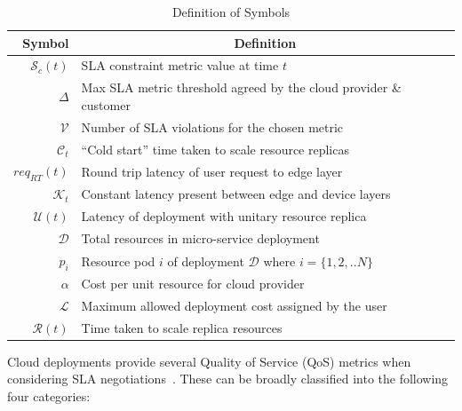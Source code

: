 \begin{table}
    \caption{Definition of Symbols}\label{tab:symbol-definitions}
    \centering
    \begin{tabular}{rl}
        \toprule
        \textbf{Symbol} & \multicolumn{1}{c}{\textbf{Definition}}\\
        \midrule
        $\mathcal{S}_{c}(t)$ & SLA constraint metric value at time $t$\\
        $\Delta$ & Max SLA metric threshold agreed by the cloud provider \& customer\\
        $\mathcal{V}$ & Number of SLA violations for the chosen metric\\
        $\mathcal{C}_{t}$ & ``Cold start'' time taken to scale resource replicas\\
        $req_{RT}(t)$ & Round trip latency of user request to edge layer\\
        $\mathcal{K}_{t}$ & Constant latency present between edge and device layers\\
        $\mathcal{U}(t)$ & Latency of deployment with unitary resource replica\\
        $\mathcal{D}$ & Total resources in micro-service deployment\\
        $p_{i}$ & Resource pod $i$ of deployment $\mathcal{D}$ where $i = \{1, 2, .. N\}$\\
        $\alpha$ & Cost per unit resource for cloud provider\\
        $\mathcal{L}$ & Maximum allowed deployment cost assigned by the user\\
        $\mathcal{R}(t)$ & Time taken to scale replica resources\\
        \toprule
    \end{tabular}
\end{table}

Cloud deployments provide several Quality of Service (QoS) metrics when considering SLA negotiations~\cite{serrano2016sla}. These can be broadly classified into the following four categories:

